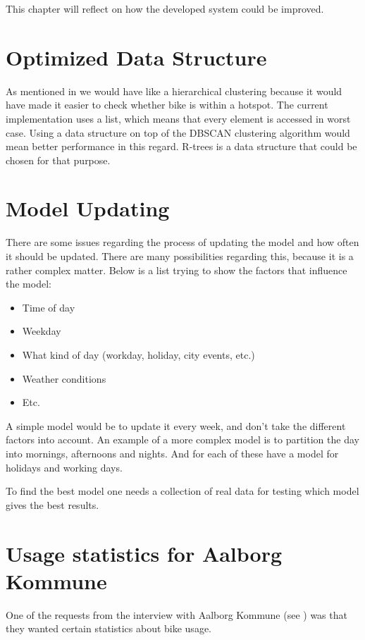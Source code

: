 This chapter will reflect on how the developed system could be improved.

\section{Optimized Data Structure}\label{ref:ods}
As mentioned in \cite{data_purporse} we would have like a hierarchical clustering because it would have made it easier to check whether bike is within a hotspot.
The current implementation uses a list, which means that every element is accessed in worst case.
Using a data structure on top of the DBSCAN clustering algorithm would mean better performance in this regard.
R-trees\cite[Section 25.3.5.3]{database_system_concepts} is a data structure that could be chosen for that purpose.

\section{Model Updating}\label{reflection:model_updating}
There are some issues regarding the process of updating the model and how often it should be updated.
There are many possibilities regarding this, because it is a rather complex matter.
Below is a list trying to show the factors that influence the model:
\begin{itemize}
\item Time of day
\item Weekday
\item What kind of day (workday, holiday, city events, etc.)
\item Weather conditions
\item Etc.
\end{itemize}
A simple model would be to update it every week, and don't take the different factors into account.
An example of a more complex model is to partition the day into mornings, afternoons and nights.
And for each of these have a model for holidays and working days.

To find the best model one needs a collection of real data for testing which model gives the best results.

\section{Usage statistics for Aalborg Kommune}
One of the requests from the interview with Aalborg Kommune (see ) was that they wanted certain statistics about bike usage.

